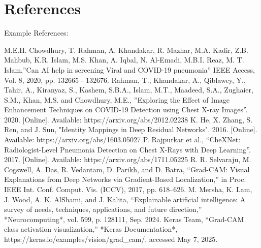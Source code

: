 \documentclass[conference]{IEEEtran}
\begin{document}
\section*{References}
Example References:
\begin{thebibliography}{00}
 M.E.H. Chowdhury, T. Rahman, A. Khandakar, R. Mazhar, M.A. Kadir, Z.B. Mahbub, K.R. Islam, M.S. Khan, A. Iqbal, N. Al-Emadi, M.B.I. Reaz, M. T. Islam,''Can AI help in screening Viral and COVID-19 pneumonia'' IEEE Access, Vol. 8, 2020, pp. 132665 - 132676.
 Rahman, T., Khandakar, A., Qiblawey, Y., Tahir, A., Kiranyaz, S., Kashem, S.B.A., Islam, M.T., Maadeed, S.A., Zughaier, S.M., Khan, M.S. and Chowdhury, M.E., ''Exploring the Effect of Image Enhancement Techniques on COVID-19 Detection using Chest X-ray Images''. 2020. [Online]. Available: https://arxiv.org/abs/2012.02238
 K. He, X. Zhang, S. Ren, and J. Sun, "Identity Mappings in Deep Residual Networks". 2016. [Online]. Available: https://arxiv.org/abs/1603.05027
 P. Rajpurkar et al., ``CheXNet: Radiologist-Level Pneumonia Detection on Chest X-Rays with Deep Learning''. 2017. [Online]. Available: https://arxiv.org/abs/1711.05225
 R. R. Selvaraju, M. Cogswell, A. Das, R. Vedantam, D. Parikh, and D. Batra, ``Grad-CAM: Visual Explanations from Deep Networks via Gradient-Based Localization,'' in Proc. IEEE Int. Conf. Comput. Vis. (ICCV), 2017, pp. 618--626.
 M. Mersha, K. Lam, J. Wood, A. K. AlShami, and J. Kalita, ``Explainable artificial intelligence: A survey of needs, techniques, applications, and future direction,'' *Neurocomputing*, vol. 599, p. 128111, Sep. 2024.
 Keras Team, ``Grad-CAM class activation visualization,'' *Keras Documentation*, https://keras.io/examples/vision/grad\_cam/, accessed May 7, 2025.
\end{thebibliography}
\end{document}
